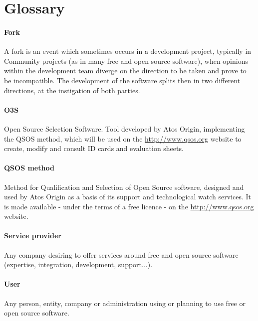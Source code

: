 %
\section*{Glossary}


\paragraph{Fork}
A fork is an event which sometimes occurs in a development project, typically in 
Community projects (as in many free and open source software), when opinions 
within the development team diverge on the direction to be taken and prove to be incompatible. 
The development of the software splits then in two different directions, 
at the instigation of both parties.

\paragraph{O3S}
Open Source Selection Software. Tool developed by Atos Origin, implementing the 
QSOS method, which will be used on the \url{http://www.qsos.org} website to create, 
modify and consult ID cards and evaluation sheets.

\paragraph{QSOS method}
Method for Qualification and Selection of Open Source software, designed and used by Atos Origin as a basis of its support and technological watch services. It is made available - under the terms of a free licence - on the  \url{http://www.qsos.org} website.

\paragraph{Service provider}
Any company desiring to offer services around free and open source software (expertise, integration, development, support...).

\paragraph{User}
Any person, entity, company or administration using or planning to use free or open source software.




